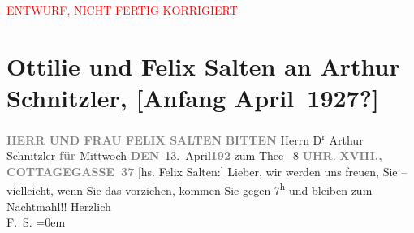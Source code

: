 
\begin{center}
            \textcolor{red}{ENTWURF, NICHT FERTIG KORRIGIERT}
                      \end{center}
            
         
         \renewcommand{\erwaehntePersonen}{Personen: Felix Salten, Ottilie Salten}
         \renewcommand{\erwaehnteOrte}{Orte: Cottagegasse, Wien}
         \renewcommand{\erwaehnteWerke}{}
               \section[Ottilie und Felix Salten an Arthur Schnitzler, {[}Anfang April 1927?{]}]{ Ottilie und Felix Salten an Arthur Schnitzler, {[}Anfang
               April 1927?{]}}\nopagebreak{}\rehead{ }\begin{ledgroupsized}[t]{13cm}\normalsize\beginnumbering \toendnotes[C]{\smallbreak\pagebreak[2]} 
\toendnotes[C]{\smallbreak}\pstart
           \noindent{}\centering{}{\pb}\textcolor{gray}{\textbf{HERR UND FRAU FELIX
                        SALTEN}}\pend
           \pstart
           \noindent{}\textcolor{gray}{\textbf{BITTEN}} Herrn D\textsuperscript{r}\pend
           \pstart
           Arthur Schnitzler\pend
           \pstart
           \textcolor{gray}{\textbf{für}}{ }Mittwoch \textcolor{gray}{\textbf{DEN}} 13. April\textcolor{gray}{\textbf{192}}\pend
           \pstart
           zum Thee\pend
           –8 \textcolor{gray}{\textbf{UHR}}.\pend
           \pstart
           \textcolor{gray}{\textbf{XVIII., COTTAGEGASSE 37}}\hfill \textcolor{gray}{\textbf{\label{K_L03581-1v}\label{K_L03581-1h}}}\pend
           \pstart
           {[}hs. Felix Salten:{]} Lieber, wir werden uns freuen, Sie
                  \label{K_L03581-2v}\label{K_L03581-2h} – vielleicht, wenn Sie das vorziehen, kommen Sie gegen 7\textsuperscript{h} und bleiben zum Nachtmahl!!\pend
           \pstart
           Herzlich {\\[\baselineskip]}\spacefill\mbox{F. S.}\pend
           \leftskip=0em{}
         
         \endnumbering{}\end{ledgroupsized}  \newcommand{\dateiname}{L03581}\newcommand{\titel}{Ottilie und Felix Salten an Arthur Schnitzler, [Anfang April 1927?]}\newcommand{\editorInnen}{Martin Anton Müller und Laura Untner}
      